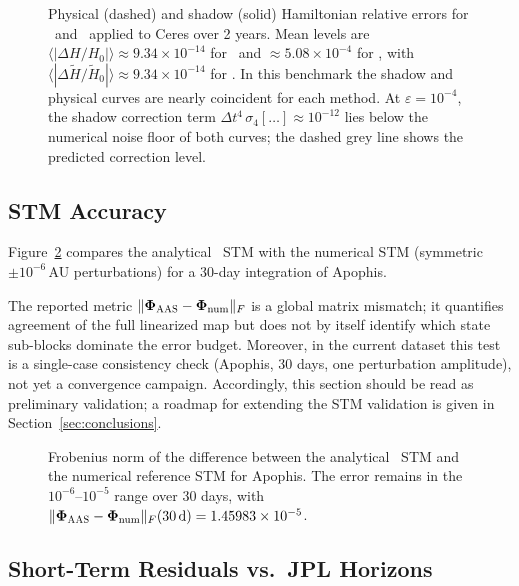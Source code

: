 \begin{figure}
\caption{
  Physical (dashed) and shadow (solid) Hamiltonian relative errors
  for \AAS\ and \saba\ applied to Ceres over 2 years.
  Mean levels are $\langle|\Delta H/H_0|\rangle\approx9.34\times10^{-14}$
  for \AAS\ and $\approx5.08\times10^{-4}$ for \saba,
  with $\langle|\Delta\tilde{H}/\tilde{H}_0|\rangle\approx9.34\times10^{-14}$
  for \AAS. In this benchmark the
  shadow and physical curves are nearly coincident for each method.
  At $\varepsilon = 10^{-4}$, the shadow correction
  term $\Delta t^4\,\sigma_4[\ldots] \approx 10^{-12}$
  lies below the numerical noise floor of both curves;
  the dashed grey line shows the predicted correction level.
  \label{fig:shadow_hamiltonian}
}
\end{figure}

\subsection{STM Accuracy}
\label{sec:stm_bench}

Figure~\ref{fig:stm_accuracy} compares the analytical \AAS\ STM
with the numerical STM (symmetric $\pm10^{-6}$\,AU perturbations)
for a 30-day integration of Apophis.

The reported metric
$\|\boldsymbol{\Phi}_{\textsc{AAS}}-\boldsymbol{\Phi}_{\mathrm{num}}\|_F$ is a global matrix mismatch;
it quantifies agreement of the full linearized map but does not by
itself identify which state sub-blocks dominate the error budget.
Moreover, in the current dataset this test is a single-case
consistency check (Apophis, 30 days, one perturbation amplitude),
not yet a convergence campaign.
Accordingly, this section should be read as preliminary validation;
a roadmap for extending the STM validation is
given in Section~\ref{sec:conclusions}.

\begin{figure}
\caption{
  Frobenius norm of the difference between the analytical \AAS\ STM
  and the numerical reference STM for Apophis.
  The error remains in the $10^{-6}$--$10^{-5}$ range over 30 days,
  with $\|\boldsymbol{\Phi}_{\textsc{AAS}}-\boldsymbol{\Phi}_{\mathrm{num}}\|_F(30\,\mathrm{d})
  =1.45983\times10^{-5}$.
  \label{fig:stm_accuracy}
}
\end{figure}

\subsection{Short-Term Residuals vs.\ JPL Horizons}
\label{sec:shortterm}

